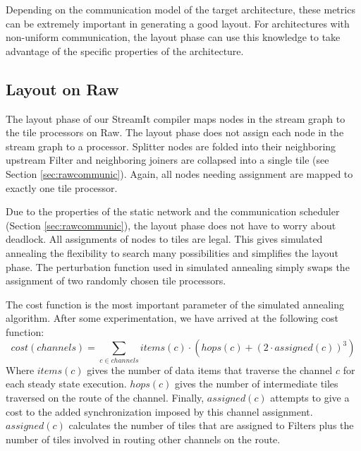 Depending on the communication model of the target architecture, these
metrics can be extremely important in generating a good layout.  For
architectures with non-uniform communication, the layout phase can use
this knowledge to take advantage of the specific properties of the
architecture.  


\subsection{Layout on Raw}

The layout phase of our StreamIt compiler maps nodes in the stream
graph to the tile processors on Raw.  
The layout phase does not assign each node in the
stream graph to a processor.  Splitter nodes are folded into their
neighboring upstream Filter and neighboring joiners are collapsed
into a single tile (see Section \ref{sec:rawcommunic}).  
Again, all nodes needing assignment are mapped to
exactly one tile processor.

Due to the properties of the static network and the communication
scheduler (Section \ref{sec:rawcommunic}), the layout phase does not have to worry
about deadlock.  All assignments of nodes to tiles are legal.  This
gives simulated annealing the flexibility to search many possibilities
and simplifies the layout phase.  The perturbation function used in
simulated annealing simply swaps the assignment of two randomly chosen
tile processors.

The cost function is the most important parameter of the simulated
annealing algorithm.  After some experimentation, we have arrived at
the following cost function: 
\[
cost(channels) = \sum _{c \in channels} items(c) \cdot \left( hops(c) + \left( 2 \cdot
assigned(c) \right) ^{3} \right)
\]
Where \(items(c)\) gives the number of data items that traverse the
channel \(c\) for each steady state execution.  \(hops(c)\) gives the
number of intermediate tiles traversed on the route of the channel.
Finally, \(assigned(c)\) attempts to give a cost to the added
synchronization imposed by this channel assignment.  \(assigned(c)\)
calculates the number of tiles that are assigned to Filters plus the
number of tiles involved in routing other channels on the route.

